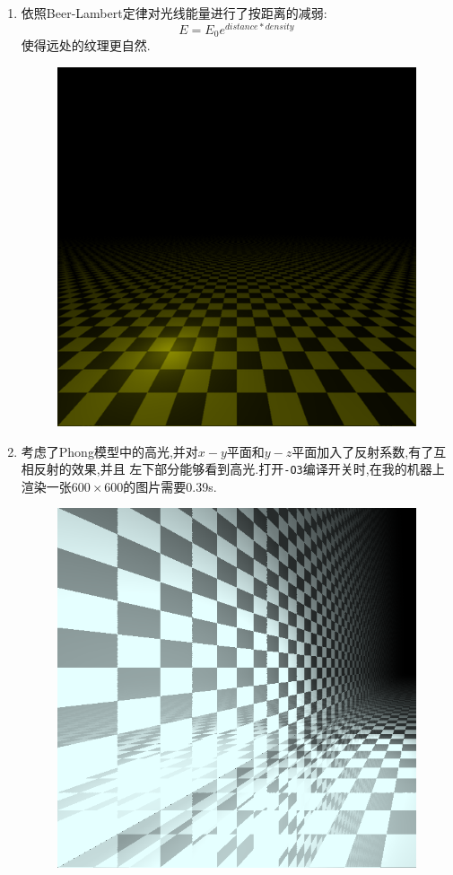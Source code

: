 \begin{enumerate}
\item
依照Beer-Lambert定律\cite{beer}对光线能量进行了按距离的减弱:
\[ E = E_0 e^{distance * density}\]
使得远处的纹理更自然.
\begin{figure}[H]
  \centering
  \includegraphics[scale=0.4]{img/plane_with_beer.png}
  \caption*{\label{fig:beer}}
\end{figure}

\item

考虑了Phong模型中的高光,并对$ x-y$平面和$ y-z$平面加入了反射系数,有了互相反射的效果,并且
左下部分能够看到高光.打开\verb|-O3|编译开关时,在我的机器上渲染一张$600 \times 600$的图片需要0.39s.
\begin{figure}[H]
  \centering
  \includegraphics[scale=0.4]{img/specular.png}
  \caption*{\label{fig:specular}}
\end{figure}


\end{enumerate}
